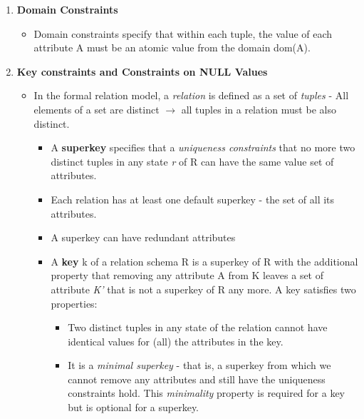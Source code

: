 \documentclass[10pt]{article}
\begin{document}
\begin{enumerate}
	\item \textbf{Domain Constraints}
	\begin{itemize}
		\item Domain constraints specify that within each tuple, the value of each attribute A must be an atomic value from the domain dom(A).
	\end{itemize}

	\item \textbf{Key constraints and Constraints on NULL Values}
	\begin{itemize}
		\item In the formal relation model, a \textit{relation} is defined as a set of \textit{tuples} - All elements of a set are distinct $\rightarrow$ all tuples in a relation must be also distinct.
		\begin{itemize}
			\item A \textbf{superkey} specifies that a \textit{uniqueness constraints} that no more two distinct tuples in any state \textit{r} of R can have the same value set of attributes.
			\item Each relation has at least one default superkey - the set of all its attributes.
			\item A superkey can have redundant attributes
			\item A \textbf{key} k of a relation schema R is a superkey of R with the additional property that removing any attribute A from K leaves a set of attribute \textit{K'} that is not a superkey of R any more. A key satisfies two properties:
			\begin{itemize}
				\item Two distinct tuples in any state of the relation cannot have identical values for (all) the attributes in the key.
				\item It is a \textit{minimal superkey} - that is, a superkey from which we cannot remove any attributes and still have the uniqueness constraints hold. This \textit{minimality} property is required for a key but is optional for a superkey.
			\end{itemize}


\end{itemize}
\end{itemize}
\end{enumerate}
\end{document}
